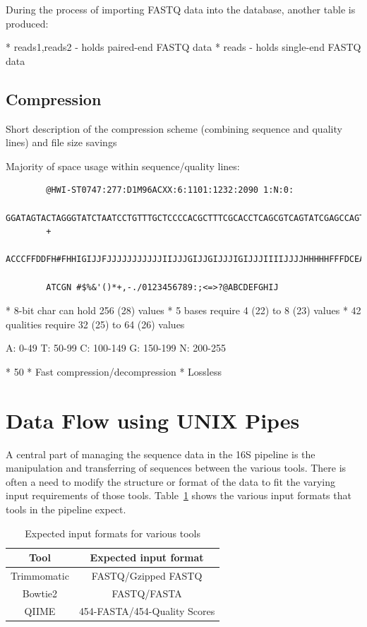 \documentclass[12pt]{article}
\begin{document}
	During the process of importing FASTQ data into the database, another table is produced:

	* reads1,reads2 - holds paired-end FASTQ data
	* reads - holds single-end FASTQ data
	
	\subsection{Compression} %
	\label{sub:compression}
	Short description of the compression scheme (combining sequence and quality lines)
	and file size savings

	Majority of space usage within sequence/quality lines:
	\begin{verbatim}
		@HWI-ST0747:277:D1M96ACXX:6:1101:1232:2090 1:N:0:
		GGATAGTACTAGGGTATCTAATCCTGTTTGCTCCCCACGCTTTCGCACCTCAGCGTCAGTATCGAGCCAGTGAGCCGCCTTCGCCACTGGTGTTCCTCCGAATATCTACGAATTTCACTGCTACACGCGGAATTCCATCCCCCTCTACCGT
		+
		ACCCFFDDFH#FHHIGIJJFJJJJJJJJJJJIIJJJGIJJGIJJJIGIJJJIIIIJJJJHHHHHFFFDCEACCDDCDDD@BDDDDBDDDDDDDDDDDDDBBB@BDEEACDDDDDDDEDDCCDDDADBBDDDDDDDDECCBDDDB@9@AA<<
		
		ATCGN #$%&'()*+,-./0123456789:;<=>?@ABCDEFGHIJ
	\end{verbatim}




	* 8-bit char can hold 256 (28) values
	* 5 bases require 4 (22) to 8 (23) values
	* 42 qualities require 32 (25) to 64 (26) values

	A: 0-49
	T: 50-99
	C: 100-149
	G: 150-199
	N: 200-255

	* 50%
	* Fast compression/decompression
	* Lossless
\section{Data Flow using UNIX Pipes} %
\label{sec:data_flow_using_unix_pipes}
A central part of managing the sequence data in the 16S pipeline is the manipulation
and transferring of sequences between the various tools. There is often a need
to modify the structure or format of the data to fit the varying input requirements
of those tools. Table~\ref{tab:expected_input} shows the various input formats that
tools in the pipeline expect.

\begin{table}
	\begin{tabular}{cc}
	\hline
	Tool & Expected input format\\
	\hline
	Trimmomatic & FASTQ/Gzipped FASTQ\\
	\hline
	Bowtie2 & FASTQ/FASTA\\
	\hline
	QIIME & 454-FASTA/454-Quality Scores\\
	\hline
	\end{tabular}
	\caption{Expected input formats for various tools}
	\label{tab:expected_input}
\end{table}
\end{document}
